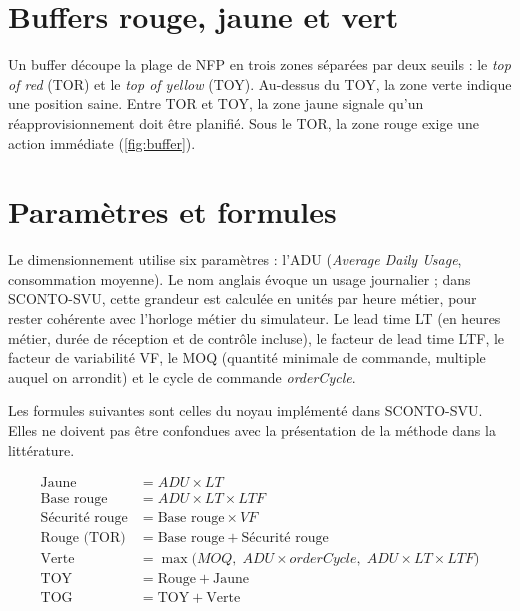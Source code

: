

\section{Buffers rouge, jaune et vert}

Un buffer découpe la plage de NFP en trois zones séparées par deux seuils : le \emph{top of
red} (TOR) et le \emph{top of yellow} (TOY). Au-dessus du TOY, la zone verte indique une
position saine. Entre TOR et TOY, la zone jaune signale qu'un réapprovisionnement doit être
planifié. Sous le TOR, la zone rouge exige une action immédiate (\cref{fig:buffer}).



\section{Paramètres et formules}

Le dimensionnement utilise six paramètres : l'ADU (\textit{Average Daily Usage}, consommation
moyenne). Le nom anglais évoque un usage journalier ; dans SCONTO-SVU, cette grandeur est calculée en
unités par heure métier, pour rester cohérente avec l'horloge métier du simulateur. Le lead time LT (en heures métier, durée de réception et de contrôle
incluse), le facteur de lead time LTF, le facteur de variabilité VF, le MOQ (quantité minimale
de commande, multiple auquel on arrondit) et le cycle de commande \emph{orderCycle}.

Les formules suivantes sont celles du noyau implémenté dans SCONTO-SVU. Elles ne doivent pas
être confondues avec la présentation de la méthode dans la littérature.

\begin{align}
  \text{Jaune}          &= ADU \times LT \label{eq:jaune}\\
  \text{Base rouge}     &= ADU \times LT \times LTF \label{eq:base}\\
  \text{Sécurité rouge} &= \text{Base rouge} \times VF \label{eq:secu}\\
  \text{Rouge (TOR)}    &= \text{Base rouge} + \text{Sécurité rouge} \label{eq:rouge}\\
  \text{Verte}          &= \max\bigl(MOQ,\; ADU \times orderCycle,\; ADU \times LT \times LTF\bigr) \label{eq:verte}\\
  \text{TOY}            &= \text{Rouge} + \text{Jaune} \label{eq:toy}\\
  \text{TOG}            &= \text{TOY} + \text{Verte} \label{eq:tog}
\end{align}


